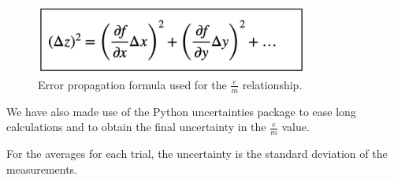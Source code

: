 \begin{figure}
    \centering
    \includegraphics[width=0.8\textwidth]{Appendix/Error_propagation.png}
    \caption{Error propagation formula used for the $\frac{e}{m}$ relationship.}
    \label{fig:error_propagation}
\end{figure}

We have also made use of the Python uncertainties package \cite{o.lebigotUncertaintiesPythonPackage} to ease long calculations and to obtain the final uncertainty in the $\frac{e}{m}$ value.

For the averages for each trial, the uncertainty is the standard deviation of the measurements.
